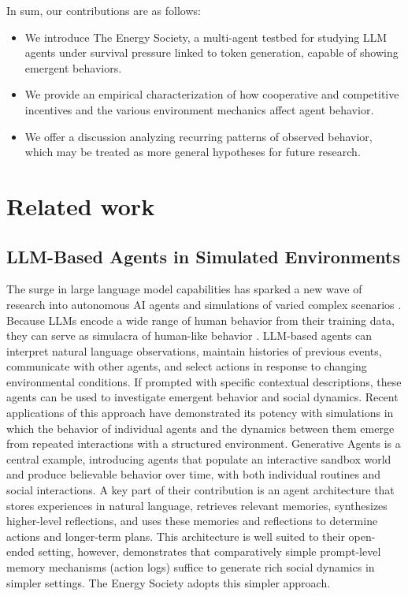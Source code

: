 \documentclass[sigconf,nonacm]{acmart}
\begin{document}
In sum, our contributions are as follows:
\begin{itemize}
    \item We introduce The Energy Society, a multi-agent testbed for studying LLM agents under survival pressure linked to token generation, capable of showing emergent behaviors.
    \item We provide an empirical characterization of how cooperative and competitive incentives and the various environment mechanics affect agent behavior.
    \item We offer a discussion analyzing recurring patterns of observed behavior, which may be treated as more general hypotheses for future research.
\end{itemize}

\section{Related work}
\subsection{LLM-Based Agents in Simulated Environments}
The surge in large language model capabilities has sparked a new wave of research into autonomous AI agents and simulations of varied complex scenarios \cite{Wang2024, gao2023largelanguagemodelsempowered}. Because LLMs encode a wide range of human behavior from their training data, they can serve as simulacra of human-like behavior \cite{horton2026largelanguagemodelssimulated}.
LLM-based agents can interpret natural language observations, maintain histories of previous events, communicate with other agents, and select actions in response to changing environmental conditions.
If prompted with specific contextual descriptions, these agents can be used to investigate emergent behavior and social dynamics.
Recent applications of this approach have demonstrated its potency with simulations in which the behavior of individual agents and the dynamics between them emerge from repeated interactions with a structured environment.
Generative Agents \cite{park2023generativeagentsinteractivesimulacra} is a central example, introducing agents that populate an interactive sandbox world and produce believable behavior over time, with both individual routines and social interactions. A key part of their contribution is an agent architecture that stores experiences in natural language, retrieves relevant memories, synthesizes higher-level reflections, and uses these memories and reflections to determine actions and longer-term plans.
This architecture is well suited to their open-ended setting, however, \citet{dai2024artificialleviathanexploringsocial} demonstrates that comparatively simple prompt-level memory mechanisms (action logs) suffice to generate rich social dynamics in simpler settings.
The Energy Society adopts this simpler approach.
\end{document}
